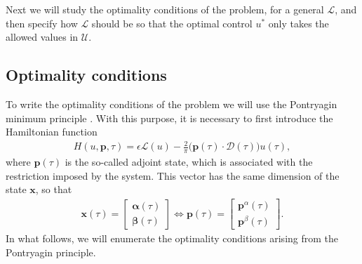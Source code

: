Next we will study the optimality conditions of the problem, for a general $\mathcal L$, and then specify how $\mathcal L$ should be so that the optimal control $u^*$ only takes the allowed values in $\mathcal U$.

\subsection{Optimality conditions}

To write the optimality conditions of the problem we will use the Pontryagin minimum principle \cite[Chapter~2.7]{bryson1975applied}. With this purpose, it is necessary to first introduce the Hamiltonian function 
\begin{align*}\label{eq:hamil}
    H(u,\bm{p},\tau) = \epsilon \mathcal{L}(u) - \frac 2\pi\big(\bm{p}(\tau) \cdot \bm{\mathcal{D}}(\tau)\big)u(\tau),
\end{align*}
where $\bm{p}(\tau)$ is the so-called adjoint state, which is associated with the restriction imposed by the system. This vector has the same dimension of the state $\bm{x}$, so that
\begin{gather}
  \bm{x}(\tau) = \begin{bmatrix} \bm{\alpha}(\tau) \\ \bm{\beta}(\tau) \end{bmatrix} \Leftrightarrow 
  \bm{p}(\tau) = \begin{bmatrix} \bm{p}^\alpha(\tau) \\ \bm{p}^\beta(\tau) \end{bmatrix}.
\end{gather}
In what follows, we will enumerate the optimality conditions arising from the Pontryagin principle.
